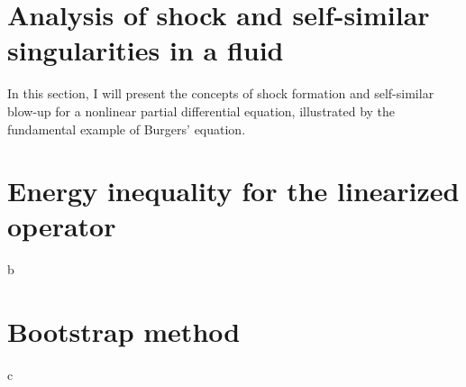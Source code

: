 \documentclass[11pt,a4paper]{article}
\begin{document}
\section{Analysis of shock and self-similar singularities in a fluid}
In this section, I will present the concepts of shock formation and self-similar blow-up for a nonlinear partial differential equation, illustrated by the fundamental example of Burgers' equation.




\section{Energy inequality for the linearized operator}
b
\section{Bootstrap method}
c
\end{document}
